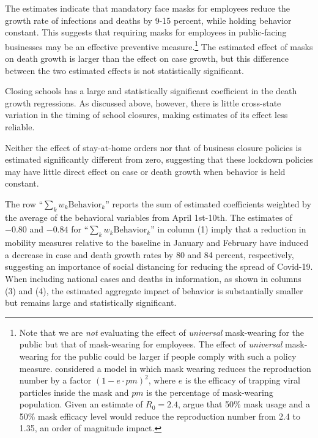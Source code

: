 \documentclass[11pt,reqno,letter]{amsart}
\theoremstyle{definition}
\begin{document}
The estimates indicate that mandatory face masks for employees
reduce the growth rate of infections and deaths by 9-15 percent, while holding behavior constant. This suggests that
requiring masks for employees in public-facing businesses may be an effective preventive measure.\footnote{Note that we are \textit{not} evaluating the effect of \textit{universal} mask-wearing for the public but that of mask-wearing for employees. The effect of \textit{universal} mask-wearing for the public could be larger if people comply with such a policy measure. \cite{tian2020calibrated} considered a  model in which mask wearing reduces  the reproduction number by a factor $(1-e \cdot pm)^2$, where $e$ is the efficacy of trapping viral particles inside the mask and $pm$ is the percentage of mask-wearing population. Given an estimate of $R_0=2.4$, \cite{howard2020} argue that  50\% mask usage and a 50\% mask efficacy level would reduce the reproduction number from 2.4 to 1.35, an order of magnitude
impact.} The estimated effect of masks on death growth is larger than the effect on case growth, but this difference between the two estimated effects is not statistically significant.

Closing schools has a large and statistically
significant coefficient in the death growth regressions. As discussed
above, however, there is little cross-state variation in the timing of school
closures, making estimates of its effect less reliable.

Neither the effect of stay-at-home orders nor that of business closure policies is estimated significantly different from zero, suggesting that these lockdown policies may  have little direct
effect on case or death growth when behavior is held constant.



The row ``$\sum_k w_k \mathrm{Behavior}_k$'' reports the sum of estimated coefficients weighted by the average of the behavioral
variables from April 1st-10th. The estimates of $-0.80$ and $-0.84$ for ``$\sum_k w_k \mathrm{Behavior}_k$'' in column (1)  imply that a reduction in mobility measures relative to the baseline in January and February have induced a decrease in case and death growth rates by 80 and 84 percent, respectively, suggesting an importance of social distancing for reducing the spread of Covid-19.
When including national cases and deaths in information, as shown in columns (3) and (4), the estimated aggregate impact of behavior is substantially smaller but remains large and statistically significant.
\end{document}
